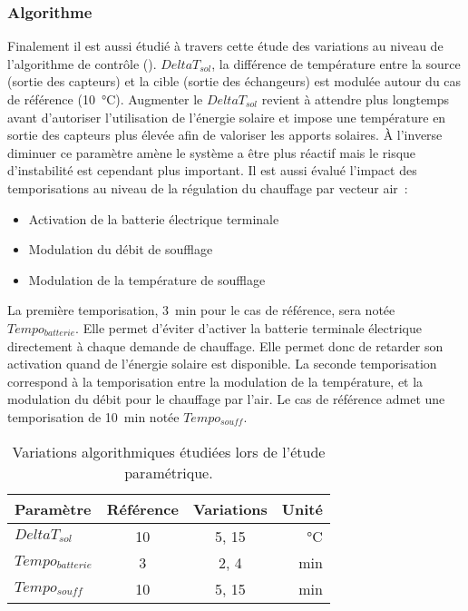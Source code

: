 \subsubsection{Algorithme} %
\label{ssub:variations_algorithmiques}
Finalement il est aussi étudié à travers cette étude des variations au niveau de
l’algorithme de contrôle (). $DeltaT_{sol}$, la différence de
température entre la source (sortie des capteurs) et la cible (sortie des échangeurs) est
modulée autour du cas de référence (\SI{10}{\celsius}). Augmenter le $DeltaT_{sol}$
revient à attendre plus longtemps avant d’autoriser l’utilisation de l’énergie solaire et
impose une température en sortie des capteurs plus élevée afin de valoriser les apports
solaires. À l’inverse diminuer ce paramètre amène le système a être plus réactif mais le
risque d’instabilité est cependant plus important. Il est aussi évalué l’impact des
temporisations au niveau de la régulation du chauffage par vecteur air~:
\begin{itemize}
  \item Activation de la batterie électrique terminale
  \item Modulation du débit de soufflage
  \item Modulation de la température de soufflage
\end{itemize}
La première temporisation, \SI{3}{min} pour le cas de référence, sera notée
$Tempo_{batterie}$. Elle permet d’éviter d’activer la batterie terminale électrique
directement à chaque demande de chauffage. Elle permet donc de retarder son activation
quand de l’énergie solaire est disponible. La seconde temporisation correspond à la temporisation
entre la modulation de la température, et la modulation du débit pour le chauffage par
l’air. Le cas de référence admet une temporisation de \SI{10}{min} notée $Tempo_{souff}$.

\begin{table}
\centering
\caption{Variations algorithmiques étudiées lors de l’étude paramétrique.
\label{tab:variations_algo}}
\begin{tabular}{l c c r}
    \toprule
    Paramètre          & Référence & Variations          & Unité         \\
    \midrule
    $DeltaT_{sol}$     & \num{10}  & \num{5}, \num{15}   & \si{\celsius} \\
    $Tempo_{batterie}$ & \num{3}   & \num{2}, \num{4}    & \si{min}      \\
    $Tempo_{souff}$    & \num{10}  & \num{5}, \num{15}   & \si{min}      \\
    \bottomrule
\end{tabular}
\end{table}



